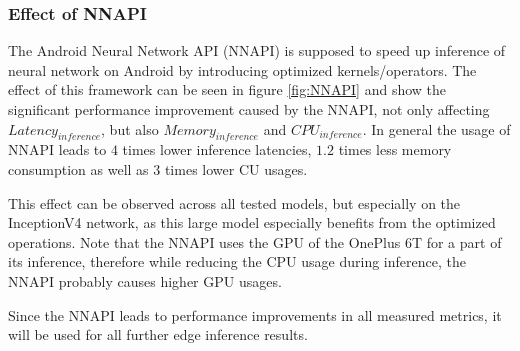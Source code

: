 \subsubsection{Effect of NNAPI}
The Android Neural Network API (NNAPI) is supposed to speed up inference of neural network on Android by introducing optimized kernels/operators. 
The effect of this framework can be seen in figure \ref{fig:NNAPI} and show the significant performance improvement caused by the NNAPI, not only affecting $Latency_{inference}$, but also $Memory_{inference}$ and $CPU_{inference}$.
In general the usage of NNAPI leads to $4$ times lower inference latencies, $1.2$ times less memory consumption as well as $3$ times lower CU usages.

This effect can be observed across all tested models, but especially on the InceptionV4 network, as this large model especially benefits from the optimized operations.
Note that the NNAPI uses the GPU of the OnePlus 6T for a part of its inference, therefore while reducing the CPU usage during inference, the NNAPI probably causes higher GPU usages.

Since the NNAPI leads to performance improvements in all measured metrics, it will be used for all further edge inference results.

